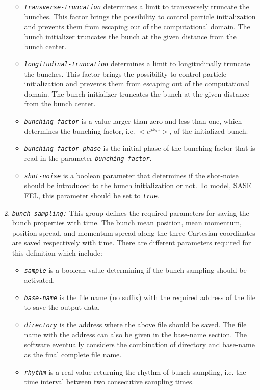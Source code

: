 \begin{enumerate}
\begin{itemize}
%
\item {\tt \small \em transverse-truncation} determines a limit to transversely truncate the bunches. This factor brings the possibility to control particle initialization and prevents them from escaping out of the computational domain. The bunch initializer truncates the bunch at the given distance from the bunch center.
%
\item {\tt \small \em longitudinal-truncation} determines a limit to longitudinally truncate the bunches. This factor brings the possibility to control particle initialization and prevents them from escaping out of the computational domain. The bunch initializer truncates the bunch at the given distance from the bunch center.
%
\item {\tt \small \em bunching-factor} is a value larger than zero and less than one, which determines the bunching factor, i.e. $<e^{jk_uz}>$, of the initialized bunch.
%
\item {\tt \small \em bunching-factor-phase} is the initial phase of the bunching factor that is read in the parameter {\tt \small \em bunching-factor}.
%
\item {\tt \small \em shot-noise} is a boolean parameter that determines if the shot-noise should be introduced to the bunch initialization or not. To model, SASE FEL, this parameter should be set to {\tt \small \em true}.
%
\end{itemize}
\item {\tt \small \em bunch-sampling:} This group defines the required parameters for saving the bunch properties with time. The bunch mean position, mean momentum, position spread, and momentum spread along the three Cartesian coordinates are saved respectively with time. There are different parameters required for this definition which include:
%
\begin{itemize}
	\item {\tt \small \em sample} is a boolean value determining if the bunch sampling should be activated.
	\item {\tt \small \em base-name} is the file name (no suffix) with the required address of the file to save the output data.
	\item {\tt \small \em directory} is the address where the above file should be saved. The file name with the address can also be given in the base-name section. The software eventually considers the combination of directory and base-name as the final complete file name.
	\item {\tt \small \em rhythm} is a real value returning the rhythm of bunch sampling, i.e. the time interval between two consecutive sampling times.

\end{itemize}
\end{enumerate}
